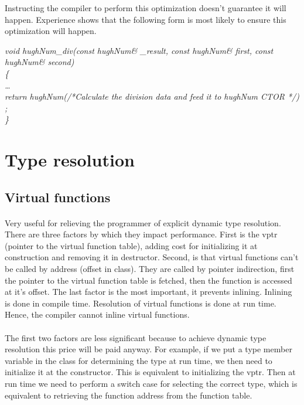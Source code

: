 \documentclass{article}
\begin{document}
 Instructing the  compiler  to perform this optimization doesn't guarantee it will happen.
 Experience shows that the following form is most likely to ensure this optimization will happen.

 \emph{
 void hughNum\_div(const hughNum\& \_result,
                 const hughNum\& first,
                 const hughNum\& second)\\
 \{\\
%     
     \ldots\\
 return hughNum(/*Calculate the division data and feed it to hughNum CTOR */) ; \\
 \}
 }



\section {Type resolution}
 
 \subsection {Virtual functions}
 \paragraph{}
 Very useful for relieving the programmer of explicit dynamic type resolution. 
 There are three factors by which they impact performance.
  First is the vptr (pointer to the virtual function table), adding cost for initializing it at construction and removing it in destructor.
 Second, is that virtual functions can't be called by address (offset in class). They are called by pointer indirection, first 
 the pointer to the virtual function table is fetched, then the function is accessed at it's offset.
 The last factor is the most important, it prevents inlining.
       Inlining is done in compile time. Resolution of virtual functions is done at run time. Hence, the compiler cannot inline virtual functions.

 \paragraph{}
 The first two factors are less significant because to achieve dynamic type resolution this price will be paid anyway.
 For example, if we put a type member variable in the class for determining the type at run time, we then need to initialize it at the constructor.
 This is equivalent to initializing the vptr.
 Then at run time we need to perform a switch case for selecting the correct type, which is equivalent to retrieving the function address from the function table.
\end{document}
